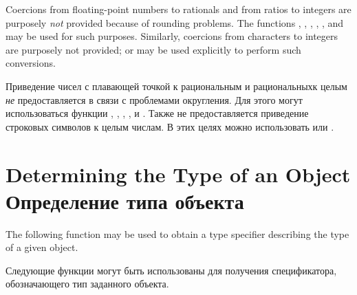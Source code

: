 \begin{defun}[Function]
Coercions from floating-point numbers to rationals and from ratios
to integers are purposely \textit{not} provided because of rounding
problems.  The functions , ,
, , , and  may be used for
such purposes.  Similarly, coercions from characters to integers
are purposely not provided;  or  may be
used explicitly to perform such conversions.

Приведение чисел с плавающей точкой к рациональным и рациональныхк целым
\textit{не} предоставляется в связи с проблемами округления. Для этого могут
использоваться функции , ,
, ,  и . Также не предоставляется
приведение строковых символов к целым числам. В этих целях можно использовать
 или .
\end{defun}

\section{Determining the Type of an Object Определение типа объекта}

The following function may be used to obtain a type specifier
describing the type of a given object.

Следующие функции могут быть использованы для получения спецификатора,
обозначающего тип заданного объекта.


